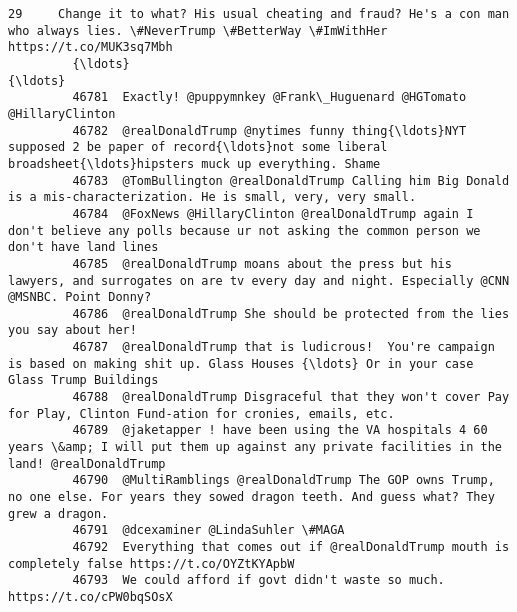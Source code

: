 \documentclass[11pt]{article}
\begin{document}
\begin{Verbatim}[commandchars=\\\{\}]
         29     Change it to what? His usual cheating and fraud? He's a con man who always lies. \#NeverTrump \#BetterWay \#ImWithHer  https://t.co/MUK3sq7Mbh                
         {\ldots}                                                                                                                                            {\ldots}                
         46781  Exactly! @puppymnkey @Frank\_Huguenard @HGTomato @HillaryClinton                                                                                            
         46782  @realDonaldTrump @nytimes funny thing{\ldots}NYT supposed 2 be paper of record{\ldots}not some liberal broadsheet{\ldots}hipsters muck up everything. Shame               
         46783  @TomBullington @realDonaldTrump Calling him Big Donald is a mis-characterization. He is small, very, very small.                                           
         46784  @FoxNews @HillaryClinton @realDonaldTrump again I don't believe any polls because ur not asking the common person we don't have land lines                 
         46785  @realDonaldTrump moans about the press but his lawyers, and surrogates on are tv every day and night. Especially @CNN @MSNBC. Point Donny?                 
         46786  @realDonaldTrump She should be protected from the lies you say about her!                                                                                  
         46787  @realDonaldTrump that is ludicrous!  You're campaign is based on making shit up. Glass Houses {\ldots} Or in your case Glass Trump Buildings                    
         46788  @realDonaldTrump Disgraceful that they won't cover Pay for Play, Clinton Fund-ation for cronies, emails, etc.                                              
         46789  @jaketapper ! have been using the VA hospitals 4 60 years \&amp; I will put them up against any private facilities in the land! @realDonaldTrump            
         46790  @MultiRamblings @realDonaldTrump The GOP owns Trump, no one else. For years they sowed dragon teeth. And guess what? They grew a dragon.                   
         46791  @dcexaminer @LindaSuhler \#MAGA                                                                                                                             
         46792  Everything that comes out if @realDonaldTrump mouth is completely false https://t.co/OYZtKYApbW                                                            
         46793  We could afford if govt didn't waste so much. https://t.co/cPW0bqSOsX                                                                                      

\end{Verbatim}
\end{document}
